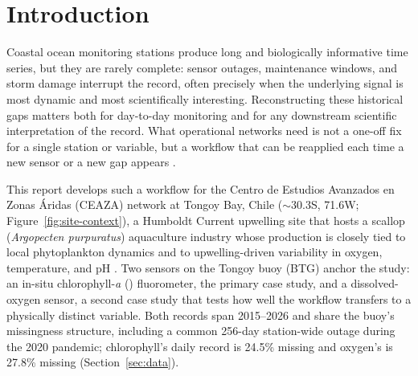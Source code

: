 \section{Introduction}
\label{sec:introduction}

Coastal ocean monitoring stations produce long and biologically informative time series, but they
are rarely complete: sensor outages, maintenance windows, and storm damage interrupt
the record, often precisely when the underlying signal is most dynamic and most scientifically
interesting. Reconstructing these historical gaps matters both for day-to-day monitoring and for
any downstream scientific interpretation of the record. What operational networks need is not a
one-off fix for a single station or variable, but a workflow that can be reapplied each time a
new sensor or a new gap appears \citep{moritz2017imputets}.

This report develops such a workflow for the Centro de Estudios Avanzados en Zonas \'{A}ridas
(CEAZA) network \citep{ceazamet_network} at Tongoy Bay, Chile
($\sim$30.3\textdegree{}S, 71.6\textdegree{}W; Figure~\ref{fig:site-context}), a Humboldt Current
upwelling site \citep{montecino2009humboldt} that hosts a scallop (\textit{Argopecten
purpuratus}) aquaculture industry whose production is closely tied to local phytoplankton
dynamics and to upwelling-driven variability in oxygen, temperature, and pH
\citep{ramajo2019scallops}. Two sensors on the Tongoy buoy (BTG) anchor the study: an in-situ
chlorophyll-\textit{a} (\chl{}) fluorometer, the primary case study, and a dissolved-oxygen
sensor, a second case study that tests how well the workflow transfers to a physically distinct
variable. Both records span 2015--2026 and share the buoy's missingness structure, including a
common 256-day station-wide outage during the 2020 pandemic; chlorophyll's daily record is 24.5\% missing and oxygen's is
27.8\% missing (Section~\ref{sec:data}).

